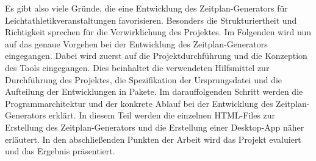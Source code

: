 Es gibt also viele Gründe, die eine Entwicklung des Zeitplan-Generators für Leichtathletikveranstaltungen favorisieren. Besonders die Strukturiertheit und Richtigkeit sprechen für die Verwirklichung des Projektes. Im Folgenden wird nun auf das genaue Vorgehen bei der Entwicklung des Zeitplan-Generators eingegangen. Dabei wird zuerst auf die Projektdurchführung und die Konzeption des Tools eingegangen. Dies beinhaltet die verwendeten Hilfsmittel zur Durchführung des Projektes, die Spezifikation der Ursprungsdatei und die Aufteilung der Entwicklungen in Pakete. Im darauffolgenden Schritt werden die Programmarchitektur und der konkrete Ablauf bei der Entwicklung des Zeitplan-Generators erklärt. In diesem Teil werden die einzelnen HTML-Files zur Erstellung des Zeitplan-Generators und die Erstellung einer Desktop-App näher erläutert. In den abschließenden Punkten der Arbeit wird das Projekt evaluiert und das Ergebnis präsentiert.


